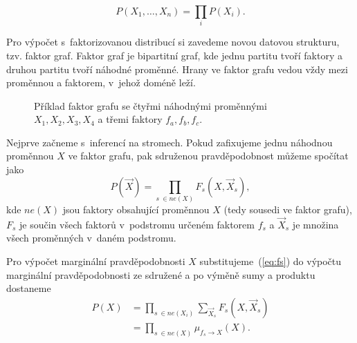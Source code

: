 \begin{equation*}
    P(X_1, \dots, X_n) = \prod_i P(X_i).
\end{equation*}

Pro výpočet s~faktorizovanou distribucí si zavedeme novou datovou strukturu, tzv. faktor graf.
Faktor graf je bipartitní graf, kde jednu partitu tvoří faktory a druhou partitu tvoří náhodné proměnné.
Hrany ve faktor grafu vedou vždy mezi proměnnou a faktorem, v~jehož doméně leží.

\begin{figure}[H]
\begin{center}
\end{center}
\caption{Příklad faktor grafu se čtyřmi náhodnými proměnnými $X_1, X_2, X_3, X_4$ a třemi faktory $f_a, f_b, f_c$.}
\end{figure}

Nejprve začneme s~inferencí na stromech.
Pokud zafixujeme jednu náhodnou proměnnou $X$ ve faktor grafu, pak sdruženou pravděpodobnost můžeme spočítat jako
\begin{equation}
    P(\vec{X}) = \prod_{s~\in ne(X)} F_s(X, \vec{X}_s),
\label{eq:fs}
\end{equation}
kde $ne(X)$ jsou faktory obsahující proměnnou $X$ (tedy sousedi ve faktor grafu), $F_s$ je součin všech faktorů v~podstromu určeném faktorem $f_s$ a $\vec{X}_s$ je množina všech proměnných v~daném podstromu.

Pro výpočet marginální pravděpodobnosti $X$ substitujeme~(\ref{eq:fs}) do výpočtu marginální pravděpodobnosti ze sdružené a po výměně sumy a produktu dostaneme
\begin{align}
P(X) &= \prod_{s~\in ne(X_i)} \sum_{\vec{X}_s} F_s(X, \vec{X}_s)
\\
&= \prod_{s~\in ne(X)} \mu_{f_s \rightarrow X}(X).
\label{eq:margx}
\end{align}

